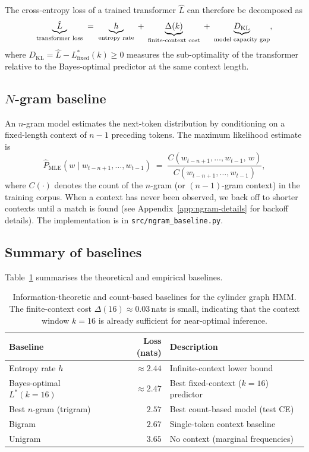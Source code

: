 \documentclass[11pt]{article}
\begin{document}
The cross-entropy loss of a trained transformer $\hat{L}$ can therefore be decomposed as
\begin{equation}\label{eq:loss-decomp}
  \underbrace{\hat{L}}_{\text{transformer loss}}
  \;=\; \underbrace{h\vphantom{\hat{L}}}_{\text{entropy rate}}
  \;+\; \underbrace{\Delta(k)\vphantom{\hat{L}}}_{\text{finite-context cost}}
  \;+\; \underbrace{D_{\mathrm{KL}}\vphantom{\hat{L}}}_{\text{model capacity gap}},
\end{equation}
where $D_{\mathrm{KL}} = \hat{L} - L^{*}_{\text{fixed}}(k) \ge 0$ measures the sub-optimality of the transformer relative to the Bayes-optimal predictor at the same context length.

\subsection{$N$-gram baseline}\label{sec:ngram-baseline}

An $n$-gram model estimates the next-token distribution by conditioning on a fixed-length context of $n{-}1$ preceding tokens.  The maximum likelihood estimate is
\begin{equation}\label{eq:ngram-mle}
  \hat{P}_{\text{MLE}}(w \mid w_{t-n+1},\dots,w_{t-1})
  \;=\; \frac{C(w_{t-n+1},\dots,w_{t-1},\, w)}
             {C(w_{t-n+1},\dots,w_{t-1})},
\end{equation}
where $C(\cdot)$ denotes the count of the $n$-gram (or $(n{-}1)$-gram context) in the training corpus.  When a context has never been observed, we back off to shorter contexts until a match is found (see Appendix~\ref{app:ngram-details} for backoff details).  The implementation is in \texttt{src/ngram\_baseline.py}.

\subsection{Summary of baselines}

Table~\ref{tab:baselines} summarises the theoretical and empirical baselines.

\begin{table}[htbp]
  \centering
  \begin{tabular}{l r l}
    \toprule
    Baseline & Loss (nats) & Description \\
    \midrule
    Entropy rate $h$ & $\approx 2.44$ & Infinite-context lower bound \\
    Bayes-optimal $L^{*}(k{=}16)$ & $\approx 2.47$ & Best fixed-context ($k{=}16$) predictor \\
    Best $n$-gram (trigram) & $2.57$ & Best count-based model (test CE) \\
    Bigram & $2.67$ & Single-token context baseline \\
    Unigram & $3.65$ & No context (marginal frequencies) \\
    \bottomrule
  \end{tabular}
  \caption{Information-theoretic and count-based baselines for the cylinder graph HMM\@.  The finite-context cost $\Delta(16) \approx 0.03$\,nats is small, indicating that the context window $k = 16$ is already sufficient for near-optimal inference.}
  \label{tab:baselines}
\end{table}
\end{document}
